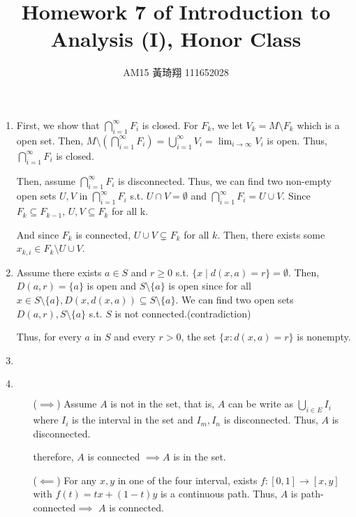 \documentclass[12pt]{article}
\title{Homework 7 of Introduction to Analysis (I), Honor Class}
\author{AM15 黃琦翔 111652028}
\begin{document}
\maketitle
\begin{enumerate}
    \item First, we show that $\displaystyle\bigcap_{i=1}^{\infty} F_i$ is closed.
    For $F_k$, we let $V_k = M\setminus F_k$ which is a open set.
    Then, $M \setminus\displaystyle(\bigcap_{i=1}^{\infty} F_i)= \displaystyle\bigcup_{i=1}^{\infty} V_i = \displaystyle\lim_{i\to \infty} V_i$  is open.
    Thus, $\displaystyle\bigcap_{i=1}^{\infty} F_i$ is closed.

    Then, assume $\displaystyle\bigcap_{i=1}^{\infty} F_i$ is disconnected. 
    Thus, we can find two non-empty open sets $U, V$ in $\displaystyle\bigcap_{i=1}^{\infty} F_i$ s.t. $U\cap V = \emptyset$ and $\displaystyle\bigcap_{i=1}^{\infty} F_i = U \cup V$.
    Since $F_k \subseteq F_{k-1}$, $U, V \subseteq F_k$ for all k.

    And since $F_k$ is connected, $U \cup V \subsetneq F_k$ for all $k$.
    Then, there exists some $x_{k, i}\in F_k \setminus U \cup V$.


    \item  Assume there exists $a \in S$ and $r \geq 0$ s.t. $\lbrace x \mid d(x, a) = r\rbrace = \emptyset$.
    Then, $D(a, r) = \lbrace a \rbrace$ is open and $S \setminus \lbrace a \rbrace$ is open 
    since for all $x \in S\setminus\lbrace a \rbrace, D(x, d(x, a)) \subseteq S \setminus\lbrace a \rbrace$.
    We can find two open sets $D(a, r), S \setminus \lbrace a \rbrace$ s.t. $S$ is not connected.(contradiction)

    Thus, for every $a$ in $S$ and every $r > 0$, the set $\lbrace x : d(x, a) = r\rbrace$ is nonempty.


    \item 

    \item$\ $\vspace{-20pt} \begin{enumerate}
        \item[($\implies$)] Assume $A$ is not in the set, that is, $A$ can be write as $\displaystyle\bigcup_{i \in E} I_i$ where $I_i$ is the interval in the set
        and $I_m, I_n$ is disconnected. Thus, $A$ is disconnected.

        therefore, $A$ is connected $\implies A$ is in the set.
      
        \item[($\impliedby$)]  For any $x, y$ in one of the four interval, 
        exists $f: [0, 1] \to [x, y]$ with $f(t) = tx + (1-t)y$ is a continuous path.
        Thus, $A$ is path-connected$\implies$ $A$ is connected.
    \end{enumerate}
\end{enumerate}
\end{document}
